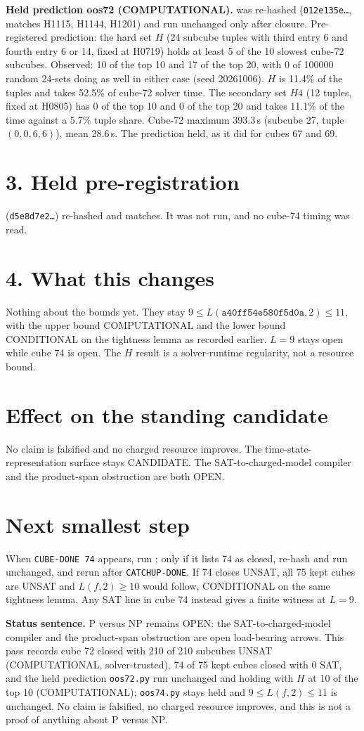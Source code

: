 \documentclass[11pt]{article}
\begin{document}
\textbf{Held prediction oos72 (COMPUTATIONAL).}  was re-hashed (\texttt{012e135e\ldots}, matches H1115, H1144, H1201) and run unchanged only after closure. Pre-registered prediction: the hard set $H$ (24 subcube tuples with third entry 6 and fourth entry 6 or 14, fixed at H0719) holds at least 5 of the 10 slowest cube-72 subcubes. Observed: 10 of the top 10 and 17 of the top 20, with 0 of 100000 random 24-sets doing as well in either case (seed 20261006). $H$ is 11.4\% of the tuples and takes 52.5\% of cube-72 solver time. The secondary set $H4$ (12 tuples, fixed at H0805) has 0 of the top 10 and 0 of the top 20 and takes 11.1\% of the time against a 5.7\% tuple share. Cube-72 maximum 393.3\,s (subcube 27, tuple $(0,0,6,6)$), mean 28.6\,s. The prediction held, as it did for cubes 67 and 69.

\section*{3. Held pre-registration}
 (\texttt{d5e8d7e2\ldots}) re-hashed and matches. It was not run, and no cube-74 timing was read.

\section*{4. What this changes}
Nothing about the bounds yet. They stay $9\le L(\texttt{a40ff54e580f5d0a},2)\le 11$, with the upper bound COMPUTATIONAL and the lower bound CONDITIONAL on the tightness lemma as recorded earlier. $L=9$ stays open while cube 74 is open. The $H$ result is a solver-runtime regularity, not a resource bound.

\section*{Effect on the standing candidate}
No claim is falsified and no charged resource improves. The time-state-representation surface stays CANDIDATE. The SAT-to-charged-model compiler and the product-span obstruction are both OPEN.

\section*{Next smallest step}
When \texttt{CUBE-DONE 74} appears, run ; only if it lists 74 as closed, re-hash and run  unchanged, and rerun  after \texttt{CATCHUP-DONE}. If 74 closes UNSAT, all 75 kept cubes are UNSAT and $L(f,2)\ge 10$ would follow, CONDITIONAL on the same tightness lemma. Any SAT line in cube 74 instead gives a finite witness at $L=9$.

\bigskip
\noindent\textbf{Status sentence.} P versus NP remains OPEN: the SAT-to-charged-model compiler and the product-span obstruction are open load-bearing arrows. This pass records cube 72 closed with 210 of 210 subcubes UNSAT (COMPUTATIONAL, solver-trusted), 74 of 75 kept cubes closed with 0 SAT, and the held prediction \texttt{oos72.py} run unchanged and holding with $H$ at 10 of the top 10 (COMPUTATIONAL); \texttt{oos74.py} stays held and $9\le L(f,2)\le 11$ is unchanged. No claim is falsified, no charged resource improves, and this is not a proof of anything about P versus NP.
\end{document}
